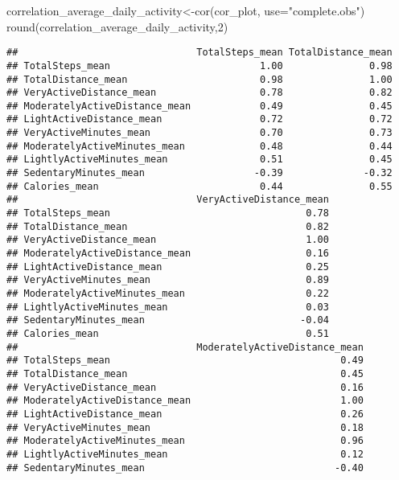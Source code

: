\documentclass[
]{article}
\newenvironment{Shaded}{\begin{snugshade}}{\end{snugshade}}
\newcommand{\AttributeTok}[1]{\textcolor[rgb]{0.77,0.63,0.00}{#1}}
\newcommand{\DecValTok}[1]{\textcolor[rgb]{0.00,0.00,0.81}{#1}}
\newcommand{\FunctionTok}[1]{\textcolor[rgb]{0.00,0.00,0.00}{#1}}
\newcommand{\NormalTok}[1]{#1}
\newcommand{\OtherTok}[1]{\textcolor[rgb]{0.56,0.35,0.01}{#1}}
\newcommand{\StringTok}[1]{\textcolor[rgb]{0.31,0.60,0.02}{#1}}
\begin{document}
\begin{Shaded}
\begin{Highlighting}[]
\NormalTok{correlation\_average\_daily\_activity}\OtherTok{\textless{}{-}}\FunctionTok{cor}\NormalTok{(cor\_plot, }\AttributeTok{use=}\StringTok{"complete.obs"}\NormalTok{)}
\FunctionTok{round}\NormalTok{(correlation\_average\_daily\_activity,}\DecValTok{2}\NormalTok{)}
\end{Highlighting}
\end{Shaded}

\begin{verbatim}
##                               TotalSteps_mean TotalDistance_mean
## TotalSteps_mean                          1.00               0.98
## TotalDistance_mean                       0.98               1.00
## VeryActiveDistance_mean                  0.78               0.82
## ModeratelyActiveDistance_mean            0.49               0.45
## LightActiveDistance_mean                 0.72               0.72
## VeryActiveMinutes_mean                   0.70               0.73
## ModeratelyActiveMinutes_mean             0.48               0.44
## LightlyActiveMinutes_mean                0.51               0.45
## SedentaryMinutes_mean                   -0.39              -0.32
## Calories_mean                            0.44               0.55
##                               VeryActiveDistance_mean
## TotalSteps_mean                                  0.78
## TotalDistance_mean                               0.82
## VeryActiveDistance_mean                          1.00
## ModeratelyActiveDistance_mean                    0.16
## LightActiveDistance_mean                         0.25
## VeryActiveMinutes_mean                           0.89
## ModeratelyActiveMinutes_mean                     0.22
## LightlyActiveMinutes_mean                        0.03
## SedentaryMinutes_mean                           -0.04
## Calories_mean                                    0.51
##                               ModeratelyActiveDistance_mean
## TotalSteps_mean                                        0.49
## TotalDistance_mean                                     0.45
## VeryActiveDistance_mean                                0.16
## ModeratelyActiveDistance_mean                          1.00
## LightActiveDistance_mean                               0.26
## VeryActiveMinutes_mean                                 0.18
## ModeratelyActiveMinutes_mean                           0.96
## LightlyActiveMinutes_mean                              0.12
## SedentaryMinutes_mean                                 -0.40

\end{verbatim}
\end{document}
